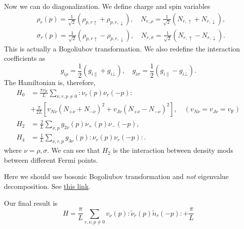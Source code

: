\documentclass[hyperref, a4paper]{article}
\newcommand*{\normalorder}[1]{: #1 :}
\begin{document}
Now we can do diagonalization. We define charge and spin variables 
\begin{equation}
    \begin{aligned}
        &\rho_r(p) = \frac{1}{\sqrt{2}} (\rho_{p, r \uparrow} + \rho_{p, r, \downarrow}), \quad 
        N_{r, \rho} = \frac{1}{\sqrt{2}} (N_{r, \uparrow} + N_{r, \downarrow}), \\
        &\sigma_r(p) = \frac{1}{\sqrt{2}} (\rho_{p, r \uparrow} - \rho_{p, r, \downarrow}), \quad 
        N_{r, \sigma} = \frac{1}{\sqrt{2}} (N_{r, \uparrow} - N_{r, \downarrow}).
    \end{aligned}
\end{equation}
This is actually a Bogoliubov transformation. We also redefine the interaction coefficients as 
\begin{equation}
    g_{i \rho} = \frac{1}{2} (g_{i \parallel} + g_{i \bot}), \quad g_{i \sigma} = \frac{1}{2} (g_{i \parallel} - g_{i \bot}).
\end{equation}
The Hamiltonian is, therefore, 
\begin{equation}
    \begin{aligned}
        H_{0} &=\frac{\pi v_\text{F}}{L} \sum_{\nu, r, p \neq 0}: \nu_{r}(p) \nu_{r}(-p): \\
        &+\frac{\pi}{2 L}\left[v_{N \nu}\left(N_{+\nu}+N_{-\nu}\right)^{2}+v_{J \nu}\left(N_{+\nu}-N_{-\nu}\right)^{2}\right], \quad\left(v_{N \nu}=v_{J \nu}=v_\text{F}\right) \\
        H_{2} &=\frac{2}{L} \sum_{\nu, p} g_{2 \nu}(p) \nu_{+}(p) \nu_{-}(-p), \\
        H_{4} &=\frac{1}{L} \sum_{\nu , r, p} g_{4 \nu}(p): \nu_{r}(p) \nu_{r}(-p):.
        \end{aligned}
\end{equation}
where $\nu = \rho, \sigma$. We can see that $H_2$ is the interaction between density mods between different Fermi points.

\begin{note*}{}
    Here we should use bosonic Bogoliubov transformation and \emph{not} eigenvalue decomposition.
    See \href{https://physics.stackexchange.com/questions/268268/bogoliubov-transformation-is-not-unitary-transformation-correct}{this link}.
\end{note*}

Our final result is 
\begin{equation}
    H = \frac{\pi}{L} \sum_{r, \nu, p \neq 0} v_\nu(p) \normalorder{\tilde{\nu}_r(p) \tilde{n}_{r}(-p)} + \frac{\pi}{L} %
\end{equation}
\end{document}
